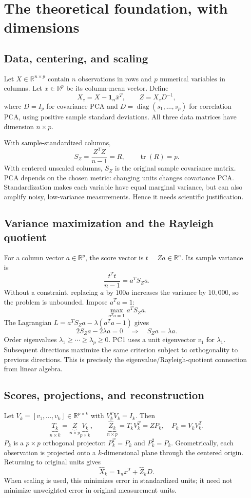 \documentclass[11pt]{article}
\newcommand{\R}{\mathbb R}\newcommand{\tr}{\operatorname{tr}}\newcommand{\Cov}{\operatorname{Cov}}
\begin{document}
\section{The theoretical foundation, with dimensions}
\subsection{Data, centering, and scaling}
Let $X\in\R^{n\times p}$ contain $n$ observations in rows and $p$ numerical variables in columns. Let $\bar x\in\R^p$ be its column-mean vector. Define
\[
X_c=X-\bm 1_n\bar x^T,\qquad Z=X_cD^{-1},
\]
where $D=I_p$ for covariance PCA and $D=\operatorname{diag}(s_1,\ldots,s_p)$ for correlation PCA, using positive sample standard deviations. All three data matrices have dimension $n\times p$.

With sample-standardized columns,
\[
S_Z=\frac{Z^TZ}{n-1}=R,\qquad \tr(R)=p.
\]
With centered unscaled columns, $S_Z$ is the original sample covariance matrix. PCA depends on the chosen metric: changing units changes covariance PCA. Standardization makes each variable have equal marginal variance, but can also amplify noisy, low-variance measurements. Hence it needs scientific justification.

\subsection{Variance maximization and the Rayleigh quotient}
For a column vector $a\in\R^p$, the score vector is $t=Za\in\R^n$. Its sample variance is
\[
\frac{t^Tt}{n-1}=a^TS_Za.
\]
Without a constraint, replacing $a$ by $100a$ increases the variance by $10{,}000$, so the problem is unbounded. Impose $a^Ta=1$:
\[
\max_{a^Ta=1}a^TS_Za.
\]
The Lagrangian $L=a^TS_Za-\lambda(a^Ta-1)$ gives
\[
2S_Za-2\lambda a=0\quad\Longrightarrow\quad S_Za=\lambda a.
\]
Order eigenvalues $\lambda_1\ge\cdots\ge\lambda_p\ge0$. PC1 uses a unit eigenvector $v_1$ for $\lambda_1$. Subsequent directions maximize the same criterion subject to orthogonality to previous directions. This is precisely the eigenvalue/Rayleigh-quotient connection from linear algebra.

\subsection{Scores, projections, and reconstruction}
Let $V_k=[v_1,\ldots,v_k]\in\R^{p\times k}$ with $V_k^TV_k=I_k$. Then
\[
\underbrace{T_k}_{n\times k}=\underbrace{Z}_{n\times p}\underbrace{V_k}_{p\times k},\qquad
\underbrace{\widehat Z_k}_{n\times p}=T_kV_k^T=ZP_k,
\quad P_k=V_kV_k^T.
\]
$P_k$ is a $p\times p$ orthogonal projector: $P_k^T=P_k$ and $P_k^2=P_k$. Geometrically, each observation is projected onto a $k$-dimensional plane through the centered origin. Returning to original units gives
\[
\widehat X_k=\bm1_n\bar x^T+\widehat Z_kD.
\]
When scaling is used, this minimizes error in standardized units; it need not minimize unweighted error in original measurement units.
\end{document}

